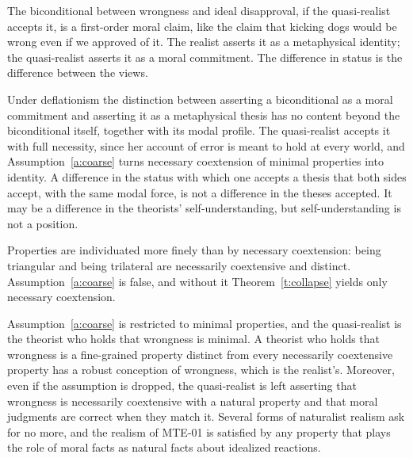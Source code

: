 \documentclass{situationist-preprint}
\begin{document}
\begin{objection}
The biconditional between wrongness and ideal disapproval, if the quasi-realist accepts it, is a first-order moral claim, like the claim that kicking dogs would be wrong even if we approved of it. The realist asserts it as a metaphysical identity; the quasi-realist asserts it as a moral commitment. The difference in status is the difference between the views.
\end{objection}

\begin{reply}
Under deflationism the distinction between asserting a biconditional as a moral commitment and asserting it as a metaphysical thesis has no content beyond the biconditional itself, together with its modal profile. The quasi-realist accepts it with full necessity, since her account of error is meant to hold at every world, and Assumption~\ref{a:coarse} turns necessary coextension of minimal properties into identity. A difference in the status with which one accepts a thesis that both sides accept, with the same modal force, is not a difference in the theses accepted. It may be a difference in the theorists' self-understanding, but self-understanding is not a position.
\end{reply}

\begin{objection}
Properties are individuated more finely than by necessary coextension: being triangular and being trilateral are necessarily coextensive and distinct. Assumption~\ref{a:coarse} is false, and without it Theorem~\ref{t:collapse} yields only necessary coextension.
\end{objection}

\begin{reply}
Assumption~\ref{a:coarse} is restricted to minimal properties, and the quasi-realist is the theorist who holds that wrongness is minimal. A theorist who holds that wrongness is a fine-grained property distinct from every necessarily coextensive property has a robust conception of wrongness, which is the realist's. Moreover, even if the assumption is dropped, the quasi-realist is left asserting that wrongness is necessarily coextensive with a natural property and that moral judgments are correct when they match it. Several forms of naturalist realism ask for no more, and the realism of MTE-01 is satisfied by any property that plays the role of moral facts as natural facts about idealized reactions.
\end{reply}
\end{document}
